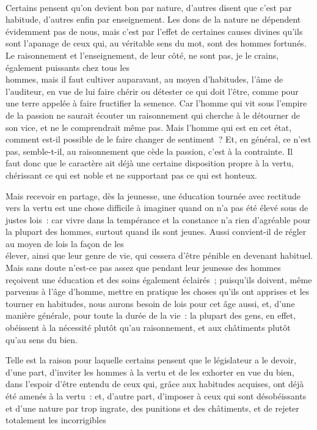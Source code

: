 \documentclass[french,twoside]{book} %
\begin{document}
\\
Certains pensent qu’on devient bon par nature, d’autres disent que c’est par habitude, d’autres enfin par enseignement. Les dons de la nature ne dépendent évidemment pas de nous, mais c’est par l’effet de certaines causes divines qu’ils sont l’apanage de ceux qui, au véritable sens du mot, sont des hommes fortunés. Le raisonnement et l’enseignement, de leur côté, ne sont pas, je le crains, également puissants chez tous les \\
hommes, mais il faut cultiver auparavant, au moyen d’habitudes, l’âme de l’auditeur, en vue de lui faire chérir ou détester ce qui doit l’être, comme pour une terre appelée à faire fructifier la semence. Car l’homme qui vit sous l’empire de la passion ne saurait écouter un raisonnement qui cherche à le détourner de son vice, et ne le comprendrait même pas. Mais l’homme qui est en cet état, comment est-il possible de le faire changer de sentiment ? Et, en général, ce n’est pas, semble-t-il, au raisonnement que cède la passion, c’est à la contrainte. Il \\
faut donc que le caractère ait déjà une certaine disposition propre à la vertu, chérissant ce qui est noble et ne supportant pas ce qui est honteux.\par
Mais recevoir en partage, dès la jeunesse, une éducation tournée avec rectitude vers la vertu est une chose difficile à imaginer quand on n’a pas été élevé sous de justes lois : car vivre dans la tempérance et la constance n’a rien d’agréable pour la plupart des hommes, surtout quand ils sont jeunes. Aussi convient-il de régler au moyen de lois la façon de les \\
élever, ainsi que leur genre de vie, qui cessera d’être pénible en  devenant habituel. Mais sans doute n’est-ce pas assez que pendant leur jeunesse des hommes reçoivent une éducation et des soins également éclairés ; puisqu’ils doivent, même parvenus à l’âge d’homme, mettre en pratique les choses qu’ils ont apprises et les tourner en habitudes, nous aurons besoin de lois pour cet âge aussi, et, d’une manière générale, pour toute la durée de la vie : la plupart des gens, en effet, obéissent à la nécessité plutôt qu’au raisonnement, et aux châtiments plutôt \\
qu’au sens du bien.\par
Telle est la raison pour laquelle certains pensent que le législateur a le devoir, d’une part, d’inviter les hommes à la vertu et de les exhorter en vue du bien, dans l’espoir d’être entendu de ceux qui, grâce aux habitudes acquises, ont déjà été amenés à la vertu : et, d’autre part, d’imposer à ceux qui sont désobéissants et d’une nature par trop ingrate, des punitions et des châtiments, et de rejeter totalement les incorrigibles \\
\end{document}
